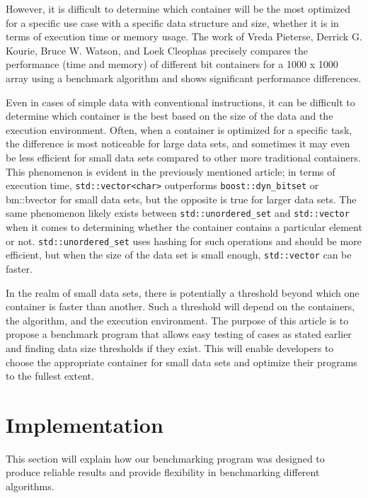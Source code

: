 \documentclass[conference]{IEEEtran}
\def\code#1{\texttt{#1}}
\begin{document}
However, it is difficult to determine which container will be the most optimized for a specific use case with a specific data structure and size, whether it is in terms of execution time or memory usage. The work of Vreda Pieterse, Derrick G. Kourie, Bruce W. Watson, and Loek Cleophas \cite{https://doi.org/10.1145/1899503.1899530} precisely compares the performance (time and memory) of different bit containers for a 1000 x 1000 array using a benchmark algorithm and shows significant performance differences.

Even in cases of simple data with conventional instructions, it can be difficult to determine which container is the best based on the size of the data and the execution environment. Often, when a container is optimized for a specific task, the difference is most noticeable for large data sets, and sometimes it may even be less efficient for small data sets compared to other more traditional containers. This phenomenon is evident in the previously mentioned article\cite{https://doi.org/10.1145/1899503.1899530}; in terms of execution time, \code{std::vector<char>} outperforms \code{boost::dyn\_bitset} or bm::bvector for small data sets, but the opposite is true for larger data sets. The same phenomenon likely exists between \code{std::unordered\_set} and \code{std::vector} when it comes to determining whether the container contains a particular element or not. \code{std::unordered\_set} uses hashing for such operations and should be more efficient, but when the size of the data set is small enough, \code{std::vector} can be faster.

In the realm of small data sets, there is potentially a threshold beyond which one container is faster than another. Such a threshold will depend on the containers, the algorithm, and the execution environment. The purpose of this article is to propose a benchmark program that allows easy testing of cases as stated earlier and finding data size thresholds if they exist. This will enable developers to choose the appropriate container for small data sets and optimize their programs to the fullest extent.

\section{Implementation}

This section will explain how our benchmarking program was designed to produce reliable results and provide flexibility in benchmarking different algorithms.
\end{document}
